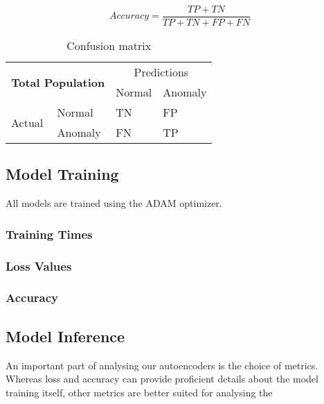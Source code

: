 \begin{equation}
    Accuracy = \frac{TP + TN}{TP + TN + FP + FN}
\end{equation}


\begin{table}[h]
\centering
\begin{tabular}{|ll|ll|}
\hline
\multicolumn{2}{|c|}{\multirow{2}{*}{\textbf{Total Population}}} & \multicolumn{2}{c|}{Predictions}      \\ \cline{3-4} 
\multicolumn{2}{|c|}{}                                           & \multicolumn{1}{l|}{Normal} & Anomaly \\ \hline
\multicolumn{1}{|l|}{\multirow{2}{*}{Actual}}      & Normal      & \multicolumn{1}{l|}{TN}     & FP      \\ \cline{2-4} 
\multicolumn{1}{|l|}{}                             & Anomaly     & \multicolumn{1}{l|}{FN}     & TP      \\ \hline
\end{tabular}
\label{tab:confmat}
\caption{Confusion matrix}
\end{table}


\subsection{Model Training}

All models are trained using the ADAM optimizer.


\subsubsection{Training Times}
\subsubsection{Loss Values}
\subsubsection{Accuracy}

\subsection{Model Inference}

An important part of analysing our autoencoders is the choice of metrics. Whereas loss and accuracy can provide proficient details about the model training itself, other metrics are better suited for analysing the 




